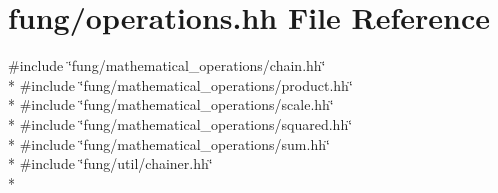 \hypertarget{operations_8hh}{}\section{fung/operations.hh File Reference}
\label{operations_8hh}
{\ttfamily \#include \char`\"{}fung/mathematical\+\_\+operations/chain.\+hh\char`\"{}}\\*
{\ttfamily \#include \char`\"{}fung/mathematical\+\_\+operations/product.\+hh\char`\"{}}\\*
{\ttfamily \#include \char`\"{}fung/mathematical\+\_\+operations/scale.\+hh\char`\"{}}\\*
{\ttfamily \#include \char`\"{}fung/mathematical\+\_\+operations/squared.\+hh\char`\"{}}\\*
{\ttfamily \#include \char`\"{}fung/mathematical\+\_\+operations/sum.\+hh\char`\"{}}\\*
{\ttfamily \#include \char`\"{}fung/util/chainer.\+hh\char`\"{}}\\*
